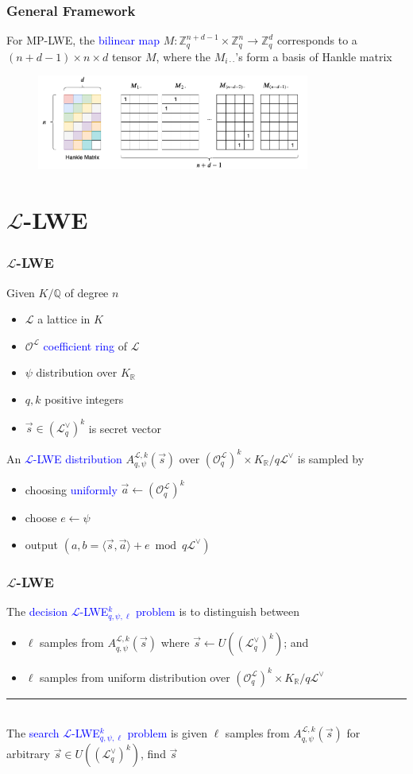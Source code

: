 \documentclass{beamer}
\newcommand{\blue}[1]{\textcolor{blue}{#1}}
\newcommand{\dgreen}[1]{\textcolor{dgreen}{#1}}
\newcommand{\cL}{\mathcal{L}}
\newcommand{\cO}{\mathcal{O}}
\newcommand{\bbQ}{\mathbb{Q}}
\newcommand{\bbR}{\mathbb{R}}
\newcommand{\bbZ}{\mathbb{Z}}
\newcommand{\cOL}{\mathcal{O}^{\mathcal{L}}}
\newcommand{\cLV}{\mathcal{L}^{\vee}}
\newcommand{\KR}{K_{\mathbb{R}}}
\newcommand{\va}{\vec{a}}
\newcommand{\vs}{\vec{s}}
\newcommand{\divline}{\noindent\rule{6cm}{0.4pt}}
\begin{document}
\frame
{
  \frametitle{General Framework}

  For MP-LWE, the \blue{bilinear map} $M:\bbZ_q^{n+d-1}\times\bbZ_q^n\to\bbZ_q^d$ corresponds to a $(n+d-1)\times n\times d$ tensor $M$, where the $M_{i\cdot\cdot}$'s form a \dgreen{basis of Hankle matrix}

  \begin{figure}[ht!]
  \includegraphics[width=0.8\textwidth]{files/Hankle-Matrix}
  \end{figure}

}

\section{$\cL$-LWE}
\frame
{
  \frametitle{$\cL$-LWE}
  Given $K/\bbQ$ of degree $n$
  \begin{itemize}
  	\item $\cL$ a lattice in $K$
  	\item $\cOL$ \blue{coefficient ring} of $\cL$
  	\item $\psi$ distribution over $K_{\bbR}$
  	\item $q,k$ positive integers
  	\item $\vs\in(\cLV_q)^k$ is secret vector
  \end{itemize}
  An \blue{$\cL$-LWE distribution} $A_{q,\psi}^{\cL,k}(\vs)$ over $(\cO_q^{\cL})^k\times\KR/q\cLV$ is sampled by
  \begin{itemize}
  	\item choosing \blue{uniformly} $\va\leftarrow(\cO_q^{\cL})^k$
  	\item choose $e\leftarrow\psi$
  	\item output $(a,b=\langle\vs,\va\rangle+e\bmod q\cLV)$
  \end{itemize}

}

\frame
{
  \frametitle{$\cL$-LWE}
  The \blue{decision $\cL$-LWE$_{q,\psi,\ell}^k$ problem} is to distinguish between
  \begin{itemize}
  	\item $\ell$ samples from \dgreen{$A_{q,\psi}^{\cL,k}(\vs)$ where $\vs\leftarrow U((\cLV_q)^k)$}; and
  	\item $\ell$ samples from \dgreen{uniform distribution over $(\cOL_q)^k\times\KR/q\cLV$}
  \end{itemize}

  \divline\\

  The \blue{search $\cL$-LWE$_{q,\psi,\ell}^k$ problem} is given $\ell$ samples from $A_{q,\psi}^{\cL,k}(\vs)$ for \dgreen{arbitrary $\vs\in U((\cLV_q)^k)$}, find $\vs$
}
\end{document}
